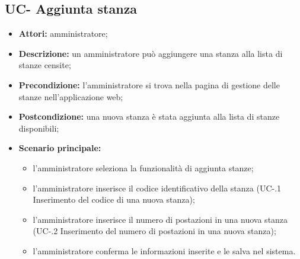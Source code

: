 \subsection{UC- Aggiunta stanza}
\begin{itemize}
    \item \textbf{Attori:} amministratore;
    \item \textbf{Descrizione:} un amministratore pu\`{o} aggiungere una stanza alla lista di stanze censite;
    \item \textbf{Precondizione:} l'amministratore si trova nella pagina di gestione delle stanze nell'applicazione web;
    \item \textbf{Postcondizione:} una nuova stanza \`{e} stata aggiunta alla lista di stanze disponibili;
    \item \textbf{Scenario principale:}
    \begin{itemize}
        \item l'amministratore seleziona la funzionalità di aggiunta stanze;
        \item l'amministratore inserisce il codice identificativo della stanza (UC-.1 Inserimento del codice di una nuova stanza);
        \item l'amministratore inserisce il numero di postazioni in una nuova stanza (UC-.2 Inserimento del numero di postazioni in una nuova stanza);
        \item l'amministratore conferma le informazioni inserite e le salva nel sistema.
    \end{itemize}
\end{itemize}


